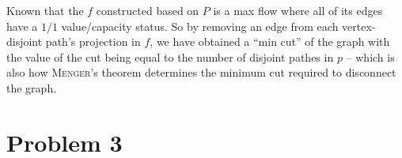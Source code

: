 \documentclass[11pt]{article}
\begin{document}
Known that the $f$ constructed based on $P$ is a max flow where all of its edges have a $1/1$ value/capacity status. So by removing an edge from each vertex-disjoint path's projection in $f$, we have obtained a ``min cut'' of the graph with the value of the cut being equal to the number of disjoint pathes in $p$ -- which is also how \textsc{Menger}'s theorem determines the minimum cut required to disconnect the graph.


\section*{Problem 3}




%
% 
% 
\end{document}
